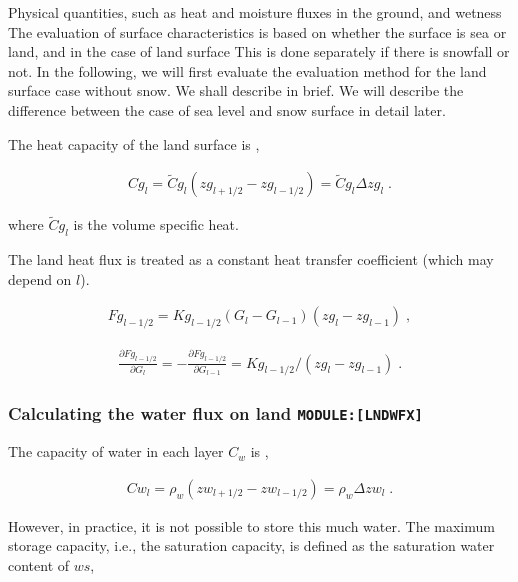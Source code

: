 Physical quantities, such as heat and moisture fluxes in the ground, and
wetness The evaluation of surface characteristics is based on whether
the surface is sea or land, and in the case of land surface This is done
separately if there is snowfall or not. In the following, we will first
evaluate the evaluation method for the land surface case without snow.
We shall describe in brief. We will describe the difference between the
case of sea level and snow surface in detail later.

The heat capacity of the land surface is ,

\begin{eqnarray}
  Cg_{l}  = \tilde{C}g_{l}(zg_{l+1/2} - zg_{l-1/2})
          = \tilde{C}g_{l} \Delta zg_{l} \; .
\end{eqnarray}

where \(\tilde{C}g_{l}\) is the volume specific heat.

The land heat flux is treated as a constant heat transfer coefficient
(which may depend on \(l\)).

\begin{eqnarray}
  Fg_{l-1/2} = Kg_{l-1/2} (G_l - G_{l-1})(zg_l - zg_{l-1}) \; ,
\end{eqnarray}

\begin{eqnarray}
  \frac{\partial Fg_{l-1/2}}{\partial G_l} = - \frac{\partial Fg_{l-1/2}}{\partial G_{l-1}}
 = Kg_{l-1/2}/(zg_l - zg_{l-1}) \; .
\end{eqnarray}

\hypertarget{calculating-the-water-flux-on-land-modulelndwfx}{%
\subsubsection{\texorpdfstring{Calculating the water flux on land
\texttt{MODULE:{[}LNDWFX{]}}}{Calculating the water flux on land MODULE:{[}LNDWFX{]}}}\label{calculating-the-water-flux-on-land-modulelndwfx}}

The capacity of water in each layer \(C_w\) is ,

\begin{eqnarray}
  Cw_{l}  = \rho_w (zw_{l+1/2} - zw_{l-1/2}) 
          = \rho_w \Delta zw_{l} \; .
\end{eqnarray}

However, in practice, it is not possible to store this much water. The
maximum storage capacity, i.e., the saturation capacity, is defined as
the saturation water content of \(ws\),

